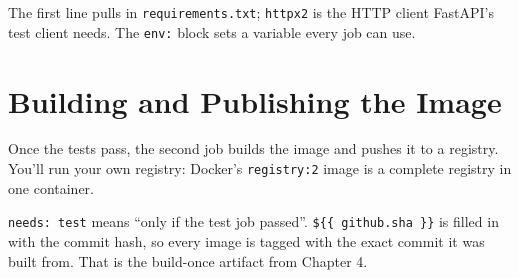The first line pulls in \texttt{requirements.txt}; \texttt{httpx2} is the HTTP client FastAPI's test client needs. The \texttt{env:} block sets a variable every job can use.

\section{Building and Publishing the Image}\label{06-your-first-pipeline:building-and-publishing-the-image}

Once the tests pass, the second job builds the image and pushes it to a registry. You'll run your own registry: Docker's \texttt{registry:2} image is a complete registry in one container.

\begin{codeblock}

\begin{Shaded}
\begin{Highlighting}[]
\AttributeTok{  }\KeywordTok{:}
\AttributeTok{    }\KeywordTok{:}
\AttributeTok{    }\KeywordTok{:}
\AttributeTok{    }\KeywordTok{:}
\AttributeTok{      }\KeywordTok{{-}}\AttributeTok{ }\KeywordTok{:}
\AttributeTok{      }\KeywordTok{{-}}\AttributeTok{ }\KeywordTok{:}
\AttributeTok{        }\KeywordTok{:}
\AttributeTok{          }\KeywordTok{:}
\KeywordTok{: }\CharTok{|}
\AttributeTok{      }\KeywordTok{{-}}\AttributeTok{ }\KeywordTok{:}
\AttributeTok{        }\KeywordTok{:}
\AttributeTok{      }\KeywordTok{{-}}\AttributeTok{ }\KeywordTok{:}
\AttributeTok{        }\KeywordTok{:}
\end{Highlighting}
\end{Shaded}

\end{codeblock}

\texttt{needs:\ test} means ``only if the test job passed''. \texttt{\$\{\{\ github.sha\ \}\}} is filled in with the commit hash, so every image is tagged with the exact commit it was built from. That is the build-once artifact from Chapter 4.

